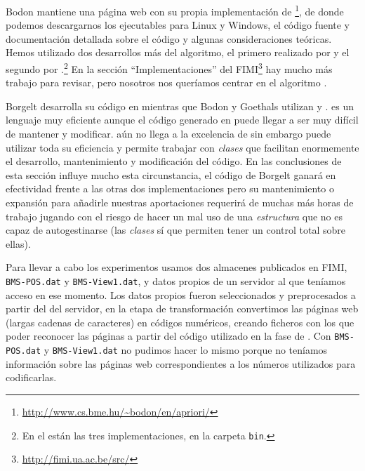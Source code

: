 Bodon mantiene una página web con su propia implementación de \apriori\footnote{\url{http://www.cs.bme.hu/~bodon/en/apriori/}}, de donde podemos descargarnos los ejecutables para Linux y Windows, el código fuente y documentación detallada sobre el código y algunas consideraciones teóricas. Hemos utilizado dos desarrollos más del algoritmo, el primero realizado por  y el segundo por .\footnote{En el \dvdAdjunto están las tres implementaciones, en la carpeta \texttt{bin}.} En la sección "`Implementaciones"' del FIMI\footnote{\url{http://fimi.ua.ac.be/src/}} hay mucho más trabajo para revisar, pero nosotros nos queríamos centrar en el algoritmo \apriori.

Borgelt desarrolla su código en \langC mientras que Bodon y Goethals utilizan \langC y \langCpp. \langC es un lenguaje muy eficiente aunque el código generado en \langC puede llegar a ser muy difícil de mantener y modificar. \langCpp aún no llega a la excelencia de \langC sin embargo puede utilizar toda su eficiencia y permite trabajar con \emph{clases} que facilitan enormemente el desarrollo, mantenimiento y modificación del código. En las conclusiones de esta sección influye mucho esta circunstancia, el código de Borgelt ganará en efectividad frente a las otras dos implementaciones pero su mantenimiento o expansión para añadirle nuestras aportaciones requerirá de muchas más horas de trabajo jugando con el riesgo de hacer un mal uso de una \emph{estructura} que no es capaz de autogestinarse (las \emph{clases} sí que permiten tener un control total sobre ellas).

Para llevar a cabo los experimentos usamos dos almacenes \D publicados en FIMI, \texttt{BMS-POS.dat} y \texttt{BMS-View1.dat}, y datos propios de un servidor al que teníamos acceso en ese momento. Los datos propios fueron seleccionados y preprocesados a partir del \flog del servidor, en la etapa de transformación convertimos las páginas web (largas cadenas de caracteres) en códigos numéricos, creando ficheros con los que poder reconocer las páginas a partir del código utilizado en la fase de \dm. Con \texttt{BMS-POS.dat} y \texttt{BMS-View1.dat} no pudimos hacer lo mismo porque no teníamos información sobre las páginas web correspondientes a los números utilizados para codificarlas.

